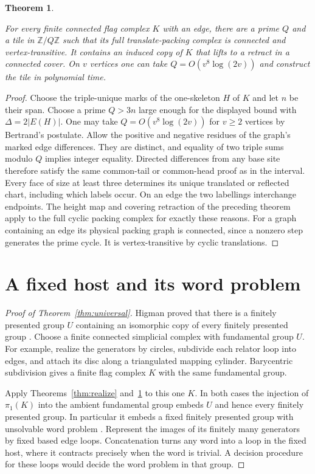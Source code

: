 \documentclass[11pt,letterpaper]{article}
\newtheorem{theorem}{Theorem}[section]
\numberwithin{equation}{section}
\begin{document}
\begin{theorem}\label{thm:tile}

For every finite connected flag complex $K$ with an edge, there are a prime $Q$ and a tile in
$\mathbb Z/Q\mathbb Z$ such that its full translate-packing complex is connected and
vertex-transitive. It contains an induced copy of $K$ that lifts to a retract in a connected
cover. On $v$ vertices one can take $Q=O(v^8\log(2v))$ and construct the tile in polynomial
time.
\end{theorem}

\begin{proof}

Choose the triple-unique marks of the one-skeleton \(H\) of \(K\) and let \(n\) be their span. Choose a
prime \(Q>3n\) large enough for the displayed bound with \(\Delta=2|E(H)|\). One may take
\(Q=O(v^8\log(2v))\) for \(v\ge2\) vertices by Bertrand's postulate. Allow the positive and
negative residues of the graph's marked edge differences. They are distinct, and equality of
two triple sums modulo \(Q\) implies integer equality. Directed differences from any base site
therefore satisfy the same common-tail or common-head proof as in the interval. Every face of
size at least three determines its unique translated or reflected chart, including which
labels occur. On an edge the two labellings interchange endpoints. The height map and covering
retraction of the preceding theorem apply to the full cyclic packing complex for exactly these
reasons. For a graph containing an edge its physical packing graph is connected, since a
nonzero step generates the prime cycle. It is vertex-transitive by cyclic translations.
\end{proof}

\section{A fixed host and its word problem}\label{sec:host}

\begin{proof}[Proof of Theorem~\ref{thm:universal}]

Higman proved that there is a finitely presented group $U$ containing an isomorphic copy of
every finitely presented group \cite{higman}. Choose a finite connected simplicial complex
with fundamental group $U$. For example, realize the generators by circles, subdivide each
relator loop into edges, and attach its disc along a triangulated mapping cylinder.
Barycentric subdivision gives a finite flag complex $K$ with the same fundamental group.

Apply Theorems~\ref{thm:realize} and~\ref{thm:tile} to this one $K$. In both cases the
injection of $\pi_1(K)$ into the ambient fundamental group embeds $U$ and hence every finitely
presented group. In particular it embeds a fixed finitely presented group with unsolvable word
problem \cite{boone}. Represent the images of its finitely many generators by fixed based edge
loops. Concatenation turns any word into a loop in the fixed host, where it contracts
precisely when the word is trivial. A decision procedure for these loops would decide the word
problem in that group.
\end{proof}
\end{document}
